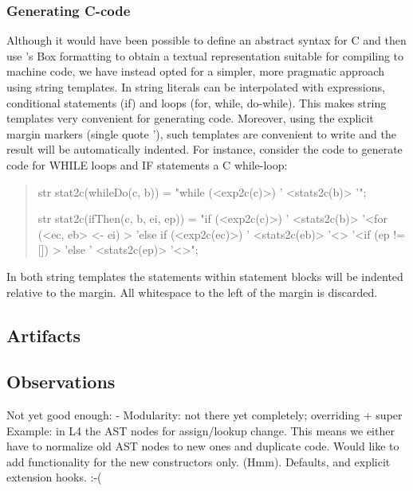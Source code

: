 \subsubsection{Generating C-code}

\noindent Although it would have been possible to define an abstract
syntax for C and then use \Rascal's Box formatting to obtain a textual
representation suitable for compiling to machine code, we have instead
opted for a simpler, more pragmatic approach using string
templates. In \Rascal string literals can be interpolated with
expressions, conditional statements (if) and loops (for, while,
do-while). This makes string templates very convenient for generating
code. Moreover, using the explicit margin markers (single quote '),
such templates are convenient to write and the result will be
automatically indented. For instance, consider the code to generate
code for WHILE loops and IF statements a C while-loop:
\begin{quote}
\begin{rascal}
str stat2c(whileDo(c, b)) = "while (<exp2c(c)>) {
                            '  <stats2c(b)>
                            '}";

str stat2c(ifThen(c, b, ei, ep)) = 
                            "if (<exp2c(c)>) {
                            '  <stats2c(b)>
                            '}<for (<ec, eb> <- ei) {>
                            'else if (<exp2c(ec)>) {
                            '  <stats2c(eb)>
                            '}<}>
                            '<if (ep != []) {>
                            'else {
                            '  <stats2c(ep)>
                            '}<}>";
\end{rascal}
\end{quote}
In both string templates the statements within statement blocks will
be indented relative to the margin. All whitespace to the left of the
margin is discarded.


\subsection{Artifacts}

\subsection{Observations}

Not yet good enough:
- Modularity: not there yet completely; overriding + super
  Example: in L4 the AST nodes for assign/lookup change. This means we
  either have to normalize old AST nodes to new ones and duplicate
  code. Would like to add functionality for the new constructors
  only. (Hmm). Defaults, and explicit extension hooks. :-(

